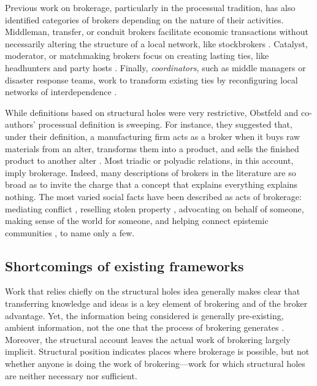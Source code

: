 \documentclass[
]{article}
\begin{document}
Previous work on brokerage, particularly in the processual tradition, has also identified categories of brokers depending on the nature of their activities. Middleman, transfer, or conduit brokers facilitate economic transactions without necessarily altering the structure of a local network, like stockbrokers \autocite[146]{stovelBrokerage2012} \autocite{spiroExtendedStructuresMediation2013} \autocite[141]{obstfeldBrokerageProcessDecoupling2014}. Catalyst, moderator, or matchmaking brokers focus on creating lasting ties, like headhunters and party hosts \autocite[146]{stovelBrokerage2012} \autocite{obstfeldBrokerageProcessDecoupling2014} \autocite{spiroExtendedStructuresMediation2013}. Finally, \emph{coordinators}, such as middle managers or disaster response teams, work to transform existing ties by reconfiguring local networks of interdependence \autocite[131-132]{spiroExtendedStructuresMediation2013}.

While definitions based on structural holes were very restrictive, Obstfeld and co-authors' processual definition is sweeping. For instance, they suggested that, under their definition, a manufacturing firm acts as a broker when it buys raw materials from an alter, transforms them into a product, and sells the finished product to another alter \autocite[145]{obstfeldBrokerageProcessDecoupling2014}. Most triadic or polyadic relations, in this account, imply brokerage. Indeed, many descriptions of brokers in the literature are so broad as to invite the charge that a concept that explains everything explains nothing. The most varied social facts have been described as acts of brokerage: mediating conflict \autocite{obstfeldBrokerageProcessDecoupling2014}, reselling stolen property \autocite{steffensmeierFenceShadowTwo1986}, advocating on behalf of someone, making sense of the world for someone, and helping connect epistemic communities \autocite[140]{stovelBrokerage2012}, to name only a few.

\subsection{Shortcomings of existing frameworks}

Work that relies chiefly on the structural holes idea generally makes clear that transferring knowledge and ideas is a key element of brokering and of the broker advantage. Yet, the information being considered is generally pre-existing, ambient information, not the one that the process of brokering generates \autocite{burtStructuralHolesGood2004}. Moreover, the structural account leaves the actual work of brokering largely implicit. Structural position indicates places where brokerage is possible, but not whether anyone is doing the work of brokering---work for which structural holes are neither necessary nor sufficient.
\end{document}
